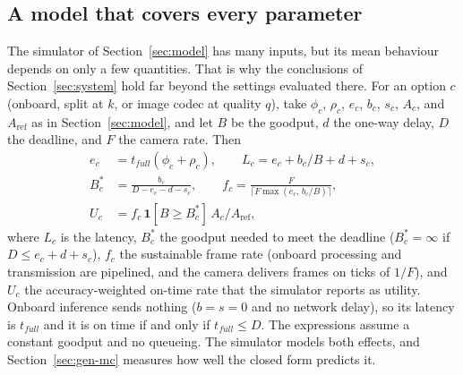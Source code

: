 \documentclass[journal,twocolumn,10pt]{IEEEtran}
\begin{document}
\subsection{A model that covers every parameter}\label{sec:gen-model}
The simulator of Section~\ref{sec:model} has many inputs, but its mean behaviour depends on only a few quantities. That is why the conclusions of Section~\ref{sec:system} hold far beyond the settings evaluated there. For an option $c$ (onboard, split at $k$, or image codec at quality $q$), take $\phi_c$, $\rho_c$, $e_c$, $b_c$, $s_c$, $A_c$, and $A_{\mathrm{ref}}$ as in Section~\ref{sec:model}, and let $B$ be the goodput, $d$ the one-way delay, $D$ the deadline, and $F$ the camera rate. Then
\begin{align*}
e_c &= t_{full}(\phi_c+\rho_c), \qquad L_c = e_c + b_c/B + d + s_c,\\
B^\ast_c &= \frac{b_c}{D-e_c-d-s_c}, \qquad f_c = \frac{F}{\lceil F\max(e_c,\, b_c/B)\rceil},\\
U_c &= f_c\,\mathbf{1}[B\ge B^\ast_c]\,A_c/A_{\mathrm{ref}},
\end{align*}
where $L_c$ is the latency, $B^\ast_c$ the goodput needed to meet the deadline ($B^\ast_c=\infty$ if $D\le e_c+d+s_c$), $f_c$ the sustainable frame rate (onboard processing and transmission are pipelined, and the camera delivers frames on ticks of $1/F$), and $U_c$ the accuracy-weighted on-time rate that the simulator reports as utility. Onboard inference sends nothing ($b=s=0$ and no network delay), so its latency is $t_{full}$ and it is on time if and only if $t_{full}\le D$. The expressions assume a constant goodput and no queueing. The simulator models both effects, and Section~\ref{sec:gen-mc} measures how well the closed form predicts it.
\end{document}
